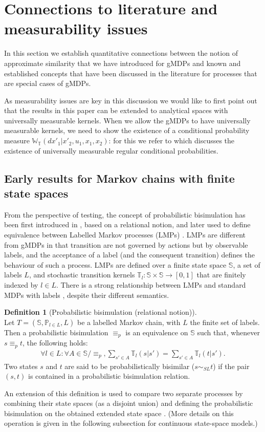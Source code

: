 \documentclass[letterpaper, 10 pt, conference]{amsart}
\theoremstyle{definition}
\newtheorem{defn}[definition]{Definition}
\theoremstyle{example}
\theoremstyle{remark}
\newcommand{\Wt}{\mathbb{W}_{\mathbb{T}}}
\begin{document}
\section{Connections to literature and measurability issues}
\label{sec:lit}

In this section we establish quantitative connections between the notion of approximate similarity that we have introduced for gMDPs and known and established concepts that have been discussed in the literature for processes that are special cases of gMDPs.   

As measurability issues are key in this discussion we would like to first point out that the results in this paper can be extended to analytical spaces with universally measurable kernels. 
When we allow the gMDPs to have universally measurable kernels, we need to show  the existence of a conditional probability measure $\Wt(d x'_1|x'_2,u_1,x_1,x_2)$: 
for this we refer to \cite{Edalat1999a} which discusses the existence of universally measurable regular conditional probabilities.   

\subsection{Early results for Markov chains with finite state spaces}
From the perspective of testing, 
the concept of probabilistic bisimulation has been first introduced in \cite{larsen1991bisimulation}, based on a relational notion, 
and later used to define equivalence between Labelled Markov processes (LMPs) \cite{Desharnais2002}. 
LMPs are different from gMDPs in that transition are not governed by actions but by observable labels, 
and the acceptance of a label (and the consequent transition) defines the behaviour of such a process. 
LMPs are defined over a finite state space $\mathbb S$, 
a set of labels $L$, and stochastic transition kernels $\mathbb T_l:\mathbb S\times\mathbb S\rightarrow [0,1]$ that are finitely indexed by $l\in L$. 
There is a strong relationship between LMPs and standard MDPs with labels \cite{bcAKNP14}, despite their different semantics. 
 \begin{defn}[Probabilistic bisimulation (relational notion)]\mbox{ }\\
Let $T=(\mathbb S,\mathbb P_{l\in L},L)$ be a labelled Markov chain, with $L$ the finite set of labels. 
Then a probabilistic bisimulation $\equiv_p$ is an equivalence on $\mathbb S$ such that, whenever $s\equiv_pt$, the following holds:
\begin{align*}\textstyle\forall l\in L:\forall A\in \mathbb S/\equiv_p, \sum_{s'\in A}\mathbb T_l(s|s')=\sum_{s'\in A}\mathbb T_l(t|s').\end{align*}
Two states $s$ and $t$ are said to be  probabilistically bisimilar ($s\sim_{SL}t$) if the pair $(s,t)$ is contained in a probabilistic bisimulation relation.
\end{defn}
An extension of this definition is used to compare two separate processes by combining their state spaces (as a disjoint union) and defining the probabilistic bisimulation on the obtained extended state space \cite{Desharnais2002}. (More details on this operation is given in the following subsection for continuous state-space models.) 
 
\end{document}
